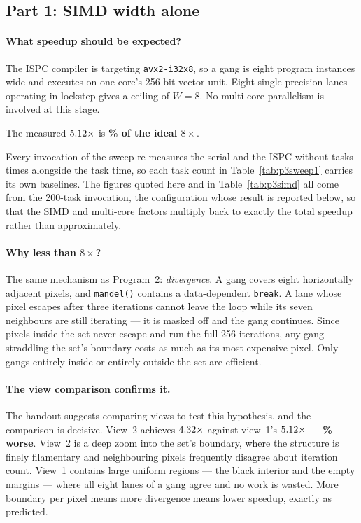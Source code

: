 \documentclass[11pt,a4paper]{article}
\begin{document}
\subsection{Part 1: SIMD width alone}

\paragraph{What speedup should be expected?} The ISPC compiler is targeting
\texttt{avx2-i32x8}, so a gang is eight program instances wide and executes on
one core's 256-bit vector unit. Eight single-precision lanes operating in
lockstep gives a ceiling of $W = 8$. No multi-core parallelism is involved at
this stage.

\begin{table}[H]
\centering
\progThreeSimd
\caption{ISPC without tasks: SIMD within a single core.}
\label{tab:p3simd}
\end{table}

The measured $5.12\times$ is
\textbf{\progThreeSimdViewOnePct\% of the ideal $8\times$}.

Every invocation of the sweep re-measures the serial and the
ISPC-without-tasks times alongside the task time, so each task count in
Table~\ref{tab:p3sweep1} carries its own baselines. The figures quoted
here and in Table~\ref{tab:p3simd} all come from the 200-task invocation,
the configuration whose result is reported below, so that the SIMD and
multi-core factors multiply back to exactly the total speedup rather than
approximately.

\paragraph{Why less than $8\times$?} The same mechanism as Program~2:
\emph{divergence}. A gang covers eight horizontally adjacent pixels, and
\texttt{mandel()} contains a data-dependent \texttt{break}. A lane whose pixel
escapes after three iterations cannot leave the loop while its seven
neighbours are still iterating --- it is masked off and the gang continues.
Since pixels inside the set never escape and run the full 256 iterations, any
gang straddling the set's boundary costs as much as its most expensive pixel.
Only gangs entirely inside or entirely outside the set are efficient.

\paragraph{The view comparison confirms it.} The handout suggests comparing
views to test this hypothesis, and the comparison is decisive. View~2 achieves
$4.32\times$ against view~1's
$5.12\times$ --- \textbf{\progThreeViewGap\% worse}. View~2 is a
deep zoom into the set's boundary, where the structure is finely filamentary
and neighbouring pixels frequently disagree about iteration count. View~1
contains large uniform regions --- the black interior and the empty margins ---
where all eight lanes of a gang agree and no work is wasted. More boundary per
pixel means more divergence means lower speedup, exactly as predicted.
\end{document}
